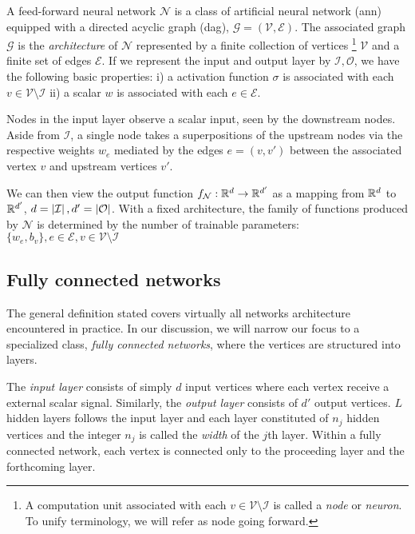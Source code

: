 A feed-forward neural network $\mathcal{N}$ is a class of artificial neural
network (\gls{ann}) equipped with a directed acyclic graph (\gls{dag}),
$\mathcal{G} = (\mathcal{V}, \mathcal{E})$. The associated graph $\mathcal{G}$
is the \textit{architecture} of $\mathcal{N}$ represented by a finite collection
of vertices \footnote{
    A computation unit associated with each $v \in \mathcal{V} \setminus \mathcal{I}$
    is called a \textit{node} or \textit{neuron}. To unify terminology, we will 
    refer as node going forward.
}
$\mathcal{V}$ and a finite set of edges $\mathcal{E}$. If we
represent the input and output layer by $\mathcal{I, O}$, we have the following
basic properties: 
i) a activation function $\sigma$ is associated with each 
$v \in \mathcal{V} \setminus \mathcal{I}$ 
ii) a scalar $w$ is associated with each $e \in \mathcal{E}$.

Nodes in the input layer observe a scalar input, seen by the downstream nodes.
Aside from $\mathcal{I}$, a single node takes a superpositions of the upstream
nodes via the respective weights $w_e$ mediated by the edges $e = (v, v')$
between the associated vertex $v$ and upstream vertices $v'$. 

We can then view the output function $f_{\mathcal{N}}: \mathbb{R}^d \to \mathbb{R}^{d'}$ as a
mapping from $\mathbb{R}^d$ to $\mathbb{R}^{d'}$, $d = \left| \mathcal{I} \right|, d' =
\left| \mathcal{O} \right|$. With a fixed architecture, the family of functions produced
by $\mathcal{N}$ is determined by the number of trainable parameters: $\{w_e,
b_v\}, e \in \mathcal{E}, v \in \mathcal{V} \setminus \mathcal{I}$

\subsection{Fully connected networks}

The general definition stated covers virtually all networks architecture
encountered in practice. In our discussion, we will narrow our focus to a
specialized class, \textit{fully connected networks}, where the vertices are
structured into layers.

The \textit{input layer} consists of simply $d$ input vertices where each vertex
receive a external scalar signal. Similarly, the \textit{output layer} consists
of $d'$ output vertices. $L$ hidden layers follows the input layer and each
layer constituted of $n_j$ hidden vertices and the integer $n_j$ is called the
\textit{width} of the $j$th layer. Within a fully connected network, each vertex
is connected only to the proceeding layer and the forthcoming layer.


